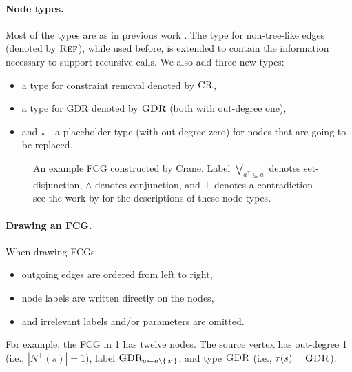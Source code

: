 \paragraph{Node types.}
Most of the types are as in previous work
\citep{DBLP:conf/nips/Broeck11,DBLP:conf/ijcai/BroeckTMDR11}. The type for
non-tree-like edges (denoted by $\operatorname{\textsc{Ref}}$), while used before, is extended to
contain the information necessary to support recursive calls. We also add three
new types:
\begin{itemize}
  \item a type for constraint removal denoted by $\operatorname{\textsc{CR}}$,
  \item a type for GDR denoted by $\operatorname{\textsc{GDR}}$ (both with out-degree one),
  \item and $\star$---a placeholder type (with out-degree zero) for nodes that are going to be replaced.
\end{itemize}

\begin{figure}[t]
  \centering
  \caption{An example FCG constructed by Crane. Label
    $\bigvee_{a^\top \subseteq a}$ denotes set-disjunction, $\land$ denotes
    conjunction, and $\bot$ denotes a contradiction---see the work by
    \citet{DBLP:conf/ijcai/BroeckTMDR11} for the descriptions of these node
    types.}\label{fig:examplefcg}
\end{figure}


\paragraph{Drawing an FCG.}
When drawing FCGs:
\begin{itemize}
  \item outgoing edges are ordered from left to right,
  \item node labels are written directly on the nodes,
  \item and irrelevant labels and/or parameters are omitted.
\end{itemize}
For example, the FCG in \cref{fig:examplefcg} has twelve nodes. The source
vertex has out-degree 1 (i.e., $|N^+(s)| = 1$), label
$\operatorname{\textsc{GDR}}_{a \gets a \setminus \{\, x \,\}}$, and type $\operatorname{\textsc{GDR}}$ (i.e.,
$\tau(s) = \operatorname{\textsc{GDR}}$).

